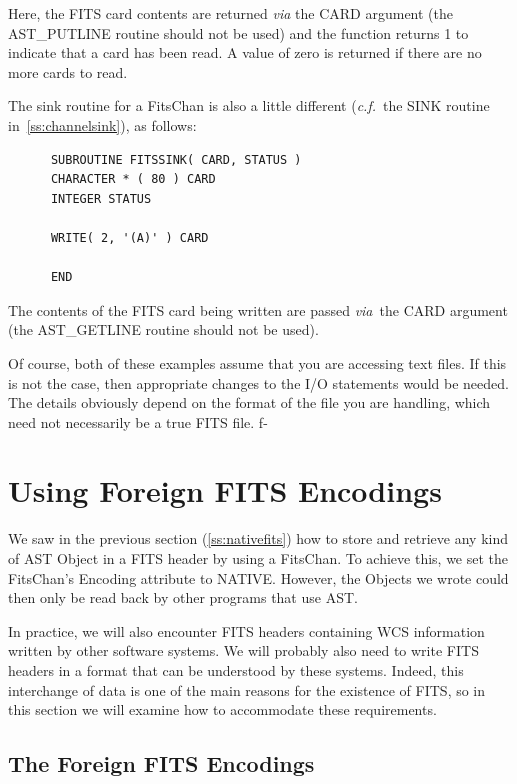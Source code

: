 \documentclass[twoside,11pt]{article}
\newcommand{\secref}[1]{\S\ref{#1}}
\renewcommand{\secref}[1]{\ref{#1}}
\begin{document}
Here, the FITS card contents are returned {\em{via}} the CARD argument
(the AST\_PUTLINE routine should not be used) and the function returns
1 to indicate that a card has been read. A value of zero is returned
if there are no more cards to read.

The sink routine for a FitsChan is also a little different
({\em{c.f.}}\ the SINK routine in~\secref{ss:channelsink}), as
follows:

\small
\begin{verbatim}
      SUBROUTINE FITSSINK( CARD, STATUS )
      CHARACTER * ( 80 ) CARD
      INTEGER STATUS

      WRITE( 2, '(A)' ) CARD

      END
\end{verbatim}
\normalsize

The contents of the FITS card being written are passed {\em{via}}\ the
CARD argument (the AST\_GETLINE routine should not be used).

Of course, both of these examples assume that you are accessing text
files. If this is not the case, then appropriate changes to the I/O
statements would be needed.  The details obviously depend on the
format of the file you are handling, which need not necessarily be a
true FITS file.
f-

\cleardoublepage
\section{\label{ss:foreignfits}Using Foreign FITS Encodings}

We saw in the previous section (\secref{ss:nativefits}) how to store
and retrieve any kind of AST Object in a FITS header by using a
FitsChan. To achieve this, we set the FitsChan's Encoding attribute to
NATIVE. However, the Objects we wrote could then only be read back by
other programs that use AST.

In practice, we will also encounter FITS headers containing WCS
information written by other software systems.  We will probably also
need to write FITS headers in a format that can be understood by these
systems. Indeed, this interchange of data is one of the main reasons
for the existence of FITS, so in this section we will examine how to
accommodate these requirements.

\subsection{\label{ss:foreignencodings}The Foreign FITS Encodings}
\end{document}
